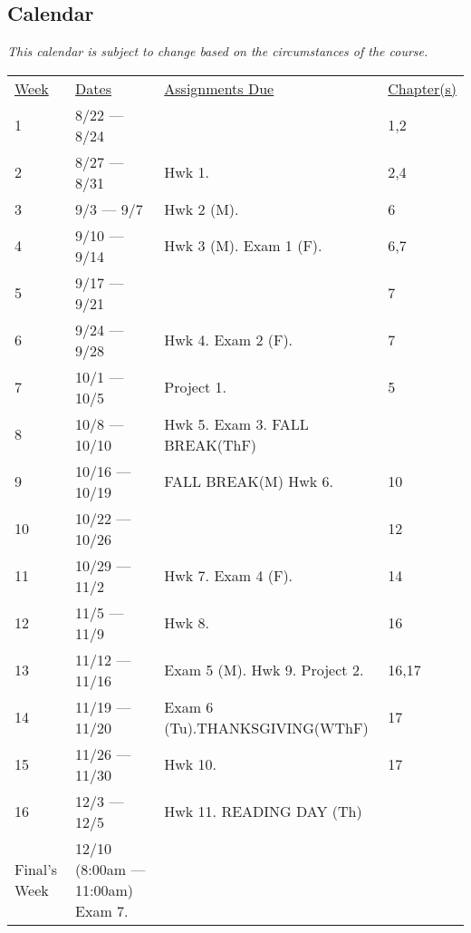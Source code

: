 \documentclass[10pt]{article}
\begin{document}
\subsection{Calendar}

\textit{This calendar is subject to change based on the circumstances of the course.}

\begin{center}
\begin{tabular}{llll}
\underline{Week} & \underline{Dates} & \underline{Assignments Due} & \underline{Chapter(s)}\\
1 & 8/22 --- 8/24 &  & 1,2 \\
2 & 8/27 --- 8/31 & Hwk 1. & 2,4  \\
3 & 9/3 --- 9/7 & Hwk 2 (M). &  6 \\
4 & 9/10 --- 9/14 & Hwk 3 (M). Exam 1 (F). &  6,7 \\
5 & 9/17 --- 9/21 & & 7 \\
6 & 9/24 --- 9/28 & Hwk 4. Exam 2 (F). & 7  \\
7 & 10/1 --- 10/5 & Project 1. &  5 \\
8 & 10/8 --- 10/10 & Hwk 5. Exam 3. FALL BREAK(ThF) &  \\
9 & 10/16 --- 10/19 & FALL BREAK(M) Hwk 6. & 10 \\
10 & 10/22 --- 10/26 &  & 12 \\
11 & 10/29 --- 11/2 & Hwk 7. Exam 4 (F). & 14  \\
12 & 11/5 --- 11/9 & Hwk 8.  &  16 \\
13 & 11/12 --- 11/16 & Exam 5 (M). Hwk 9. Project 2. & 16,17  \\
14 & 11/19 --- 11/20 & Exam 6 (Tu).THANKSGIVING(WThF) & 17 \\
15 & 11/26 --- 11/30 & Hwk 10.  & 17 \\
16 & 12/3 --- 12/5 & Hwk 11.  READING DAY (Th) & \\
Final's Week & 12/10 (8:00am --- 11:00am) Exam 7. & \\
\end{tabular}
\end{center}
\end{document}
